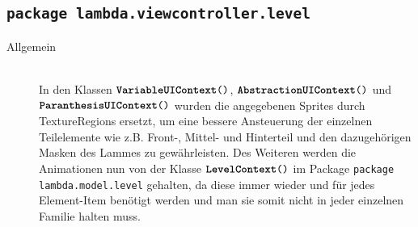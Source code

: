 \subsection{\texttt{package lambda.viewcontroller.level}}

\begin{description}
\item[Allgemein] \hfill \\ In den Klassen $\texttt{\textbf{VariableUIContext}()}$, $\texttt{\textbf{AbstractionUIContext}()}$ und $\texttt{\textbf{ParanthesisUIContext}()}$ wurden die angegebenen Sprites durch TextureRegions ersetzt, um eine bessere Ansteuerung der einzelnen Teilelemente wie z.B. Front-, Mittel- und Hinterteil und den dazugehörigen Masken des Lammes zu gewährleisten. Des Weiteren werden die Animationen nun von der Klasse $\texttt{\textbf{LevelContext}()}$ im Package \texttt{package lambda.model.level} gehalten, da diese immer wieder und für jedes Element-Item benötigt werden und man sie somit nicht in jeder einzelnen Familie halten muss.

\end{description}